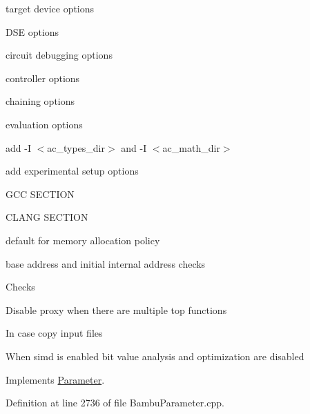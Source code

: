 target device options

D\+SE options

circuit debugging options

controller options

chaining options

evaluation options

add -\/I $<$ac\+\_\+types\+\_\+dir$>$ and -\/I $<$ac\+\_\+math\+\_\+dir$>$

add experimental setup options

G\+CC S\+E\+C\+T\+I\+ON

C\+L\+A\+NG S\+E\+C\+T\+I\+ON

default for memory allocation policy

base address and initial internal address checks

Checks

Disable proxy when there are multiple top functions

In case copy input files

When simd is enabled bit value analysis and optimization are disabled 

Implements \hyperlink{classParameter_a87315799c1a893687f796890f5d4f44d}{Parameter}.



Definition at line 2736 of file Bambu\+Parameter.\+cpp.



